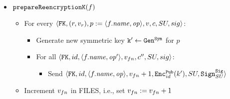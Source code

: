 {\begin{itemize}
        \item \( \prepareReencryptionF \)
        \begin{itemize}
            \item For every \( \pt{(\role, \rolev)}{p:=\twoang{\file.\fname}{\operation}}{v}{c}{SU}{sig} \):
            \begin{itemize}
                \item Generate new symmetric key \( \keyn' \leftarrow \gensym \) for \( p \)
                \item For all \( \pt{id}{\twoang{\file.\fname}{\operation'}}{\filev}{c''}{SU}{sig} \):
                \begin{itemize}
                    \item Send \( \pt{id}{\twoang{\file.\fname}{\operation}}{\filev+1}{\encpub{id}{k'}}{SU}{\sig{SU}} \)
                \end{itemize}
            \end{itemize}
            \item Increment \( \filev \) in FILES, i.e., set \( \filev := \filev + 1 \)
        \end{itemize}

    \end{itemize}
}{
    \begin{itemize}


\end{itemize}}
